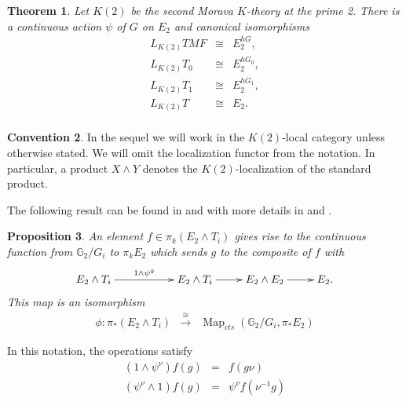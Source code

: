 \documentclass{amsart}
\DeclareMathOperator{\Map}{Map}
\newcommand {\G}{{\mathbb G}}
\newcommand{\lra}{\longrightarrow}              %
\numberwithin{equation}{section}
\newtheorem{thm}{Theorem}[section]
\newtheorem{prop}[thm]{Proposition}
\theoremstyle{definition}  %
\newtheorem{set theory}[thm]{Set Theoretic Prelude}
\newtheorem{convention}[thm]{Convention}
\begin{document}
\begin{thm} %
Let $K(2)$ be the second Morava $K$-theory at the prime 2.  
There is a continuous action $\psi$  of $G$ on $E_2$ and  canonical isomorphisms
\begin{eqnarray*}
L_{K(2)}TMF&\cong& E_2^{hG},\\
L_{K(2)}T_0&\cong& E_2^{hG_0},\\
L_{K(2)}T_1&\cong& E_2^{hG_1},\\
L_{K(2)}T&\cong& E_2.\\
\end{eqnarray*}
\end{thm}
\begin{convention}
In the sequel we will work in the $K(2)$-local category unless otherwise stated. We will omit the localization functor from the notation. In particular, a product $X\wedge Y$ denotes the $K(2)$-localization of the standard product.
\end{convention}
The following result can be found in \cite{MR1333942} and with more details in \cite{MR1763961} and \cite{MR2076002}.
\begin{prop} 
An element $f\in \pi_k (E_2 \wedge T_i)$ gives rise to the continuous function 
from $\G_2/G_i$ to $\pi_k E_2$ which sends $g$ to  the composite of $f$ with 
$$ \xymatrix{E_2\wedge T_i \ar[rr]^{ 1\wedge \psi^g  }&&E_2\wedge T_i\ar[r] & E_2 \wedge E_2\ar[r]& E_2.}$$  
This map is an isomorphism
\begin{eqnarray*}
\phi: \pi_* (E_2 \wedge T_i)& \stackrel{\cong}{\lra} &  \Map_{cts}(\G_2/G_i , \pi_* E_2)
\end{eqnarray*}
\end{prop}
In this notation, the operations satisfy
\begin{eqnarray*}
(1\wedge \psi^\nu)f (g)& =& f(g \nu )\\
( \psi^\nu \wedge 1 )f (g)& =& \psi^\nu  f(\nu^{-1}g  )
\end{eqnarray*}
\end{document}
